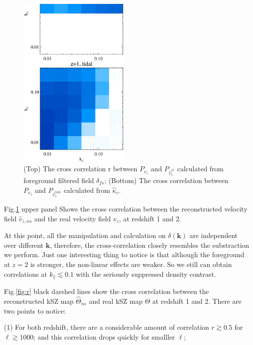 \begin{figure}[tbp]
\begin{center}
\includegraphics[width=0.48\textwidth]{figure/compare_powv2d_z1z2.eps}
\end{center}
\vspace{-0.7cm}
\caption{(Top) The cross correlation r between $P_{v_z}$ and 
    $P_{\hat v_z^{fs}}$ calculated from foreground filtered field $\delta_{fs}$; 
    (Bottom) The cross correlation between $P_{v_z}$ and $P_{\hat v_z^{tide}}$ calculated from $\hat \kappa_c$. 
}
\label{fig:v}
\end{figure}
Fig.\ref{fig:v} upper panel Shows the cross correlation between 
the reconstructed velocity field $\hat v_{z,ns}$ and the real velocity field $v_z$, at redshift 1 and 2. 

At this point, all the manipulation and calculation on $\delta(\bm{k})$ are independent over different $\bm{k}$, 
therefore, the cross-correlation closely resembles the substraction we perform. 
Just one interesting thing to notice is that although the foreground at $z=2$ is stronger, 
the non-linear effects are weaker.  
So we still can obtain correlations at $k_\parallel \lesssim 0.1$ with the seriously suppressed density contrast. 

Fig.\ref{fig:r} black darshed lines show the cross correlation between the reconstructed kSZ map 
$\hat\Theta_{ns}$ and real kSZ map $\Theta$ at redshift 1 and 2.  
There are two points to notice: 

(1) For both redshift, there are a considerable amount of correlation 
$r\gtrsim0.5$ for $\ell \gtrsim 1000$; 
and this correlation drops quickly for smalller $\ell$; 

